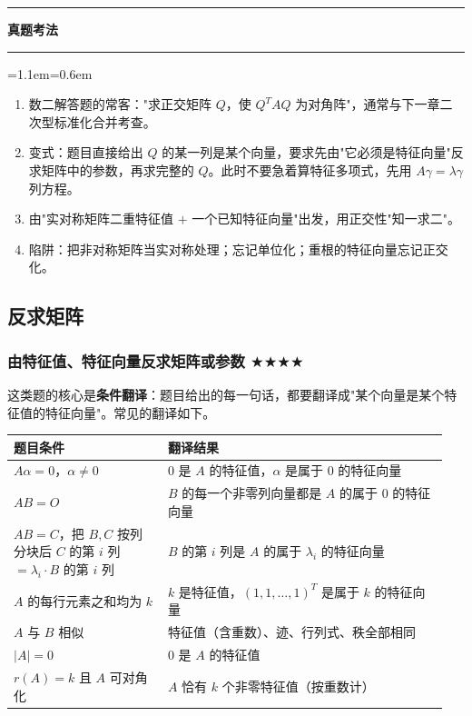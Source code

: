 \documentclass[11pt,openany,UTF8]{ctexbook}
\newcommand{\callouthead}[2]{%
  \par\addvspace{7pt}\noindent
  {\color{#1}\rule[-0.15em]{3pt}{1.05em}}\hspace{0.5em}%
  {\bfseries\color{#1}#2}\par\nobreak\vspace{-0.35em}%
  {\color{rulesep}\hrule height 0.4pt}\nobreak\vspace{0.45em}%
  \begingroup\small\setlength{\parindent}{0pt}%
  \leftskip=1.1em\rightskip=0.6em\noindent\ignorespaces}
\newcommand{\calloutend}{\par\endgroup\addvspace{7pt}}
\newenvironment{callexam}[1]{\callouthead{exambar}{#1}}{\calloutend}
\begin{document}
\begin{callexam}{真题考法}
\begin{enumerate}
\item 数二解答题的常客："求正交矩阵 $Q$，使 $Q^TAQ$ 为对角阵"，通常与下一章二次型标准化合并考查。
\item 变式：题目直接给出 $Q$ 的某一列是某个向量，要求先由"它必须是特征向量"反求矩阵中的参数，再求完整的 $Q$。此时不要急着算特征多项式，先用 $A\gamma=\lambda\gamma$ 列方程。
\item 由"实对称矩阵二重特征值 $+$ 一个已知特征向量"出发，用正交性"知一求二"。
\item 陷阱：把非对称矩阵当实对称处理；忘记单位化；重根的特征向量忘记正交化。
\end{enumerate}
\end{callexam}

\subsection{反求矩阵}

\subsubsection{由特征值、特征向量反求矩阵或参数 $\bigstar$$\bigstar$$\bigstar$$\bigstar$}

这类题的核心是\textbf{条件翻译}：题目给出的每一句话，都要翻译成"某个向量是某个特征值的特征向量"。常见的翻译如下。

\begingroup\small\setlength{\tabcolsep}{4.0pt}
\begin{longtable}{@{}L{0.3359\linewidth}L{0.6098\linewidth}@{}}
\toprule
\textbf{题目条件} & \textbf{翻译结果} \\
\midrule
\endhead
$A\alpha=0$，$\alpha\neq0$ & $0$ 是 $A$ 的特征值，$\alpha$ 是属于 $0$ 的特征向量 \\
$AB=O$ & $B$ 的每一个非零列向量都是 $A$ 的属于 $0$ 的特征向量 \\
$AB=C$，把 $B,C$ 按列分块后 $C$ 的第 $i$ 列 $=\lambda_i\cdot B$ 的第 $i$ 列 & $B$ 的第 $i$ 列是 $A$ 的属于 $\lambda_i$ 的特征向量 \\
$A$ 的每行元素之和均为 $k$ & $k$ 是特征值，$(1,1,\dots,1)^T$ 是属于 $k$ 的特征向量 \\
$A$ 与 $B$ 相似 & 特征值（含重数）、迹、行列式、秩全部相同 \\
$\vert A\vert=0$ & $0$ 是 $A$ 的特征值 \\
$r(A)=k$ 且 $A$ 可对角化 & $A$ 恰有 $k$ 个非零特征值（按重数计） \\
\bottomrule
\end{longtable}
\endgroup
\end{document}

